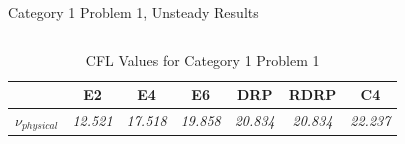 \begin{frame}{Category 1 Problem 1, Unsteady Results}
  \begin{columns}
    \begin{table}[htp!]
    \centering
    \caption{CFL Values for Category 1 Problem 1}
    \label{tab:C1P1_CFL}
    \begin{tabular}{|l|c|c|c|c|c|c|}
    \hline & \multicolumn{1}{c|}{\textbf{E2}} & 
    \multicolumn{1}{c|}{\textbf{E4}} & 
    \multicolumn{1}{c|}{\textbf{E6}} & 
    \multicolumn{1}{c|}{\textbf{DRP}} & 
    \multicolumn{1}{c|}{\textbf{RDRP}}& 
    \multicolumn{1}{c|}{\textbf{C4}}\\ \hline
    \textbf{$\nu_{physical}$} & 
    \textit{12.521} & 
    \textit{17.518} & 
    \textit{19.858} & 
    \textit{20.834} & 
    \textit{20.834} & 
    \textit{22.237}\\ \hline
    \end{tabular}
    \end{table}
    ~~ \newline
    \begin{figure}[hbtp!]
    	\centering
    	\includegraphics[width=1.0\textheight]{Figures/C1P1_MaxDisturbance_zoom}
    	\label{fig:Unsteady_C1P1}
    \end{figure}
  \end{columns}
\end{frame}


